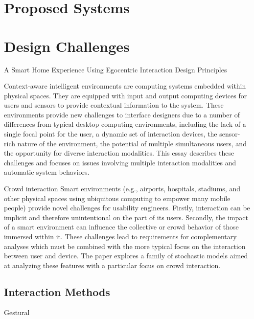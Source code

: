 \documentclass[oribibl]{llncs}
\begin{document}

\section{Proposed Systems}		\label{sec:proposed_systems}

\section{Design Challenges}		\label{sec:design_challenges}
\cite{Wiberg:2008:EIC:1543137.1543141}

A Smart Home Experience Using Egocentric Interaction Design Principles \cite{Surie:2012:SHE:2469451.2469943}

Context-aware intelligent environments are computing systems embedded within physical spaces. They are equipped with input and output computing devices for users and sensors to provide contextual information to the system. These environments provide new challenges to interface designers due to a number of differences from typical desktop computing environments, including the lack of a single focal point for the user, a dynamic set of interaction devices, the sensor-rich nature of the environment, the potential of multiple simultaneous users, and the opportunity for diverse interaction modalities. This essay describes these challenges and focuses on issues involving multiple interaction modalities and automatic system behaviors. \cite{Shafer:2001:IIC:1463108.1463124}

Crowd interaction
Smart environments (e.g., airports, hospitals, stadiums, and other physical spaces using ubiquitous computing to empower many mobile people) provide novel challenges for usability engineers. Firstly, interaction can be implicit and therefore unintentional on the part of its users. Secondly, the impact of a smart environment can influence the collective or crowd behavior of those immersed within it. These challenges lead to requirements for complementary analyses which must be combined with the more typical focus on the interaction between user and device. The paper explores a family of stochastic models aimed at analyzing these features with a particular focus on crowd interaction.
\cite{Harrison:2009:ECI:1570433.1570456}

\subsection{Interaction Methods}		\label{sub:interaction_methods}
Gestural
\cite{Carrino:2011:ATH:2027296.2027317}
\end{document}
